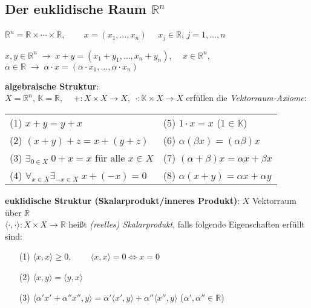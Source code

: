 \subsection{%
    \texorpdfstring{Der euklidische Raum $\mathbb{R}^n$}%
    {Der euklidische Raum ℝⁿ}%
}

$\mathbb{R}^n = \mathbb{R} \times \cdots \times \mathbb{R}$,
$\qquad x = (x_1, \ldots, x_n) \quad$ $x_j \in \mathbb{R}$,
$j = 1, \ldots, n$

$x, y \in \mathbb{R}^n \;\rightarrow\; x + y = (x_1 + y_1, \ldots, x_n + y_n)$,
$\quad x \in \mathbb{R}^n$, $\alpha \in \mathbb{R} \;\rightarrow\;
\alpha \cdot x = (\alpha \cdot x_1, \ldots, \alpha \cdot x_n)$

\textbf{algebraische Struktur}: \\
$X = \mathbb{R}^n$, $\mathbb{K} = \mathbb{R}$,
$\quad \boldsymbol{+}: X \times X \rightarrow X$, $\;\boldsymbol{\cdot}:
\mathbb{K} \times X \rightarrow X$
erfüllen die \emph{Vektorraum-Axiome}:

\begin{tabular}{p{8cm}p{8cm}}
    (1) $x + y = y + x$ &
    (5) $1 \cdot x = x$ ($1 \in \mathbb{K}$) \\
    (2) $(x + y) + z = x + (y + z)$ &
    (6) $\alpha (\beta x) = (\alpha \beta) x$ \\
    (3) $\exists_{0 \in X}\; 0 + x = x$ für alle $x \in X$ &
    (7) $(\alpha + \beta) x = \alpha x + \beta x$ \\
    (4) $\forall_{x \in X} \exists_{-x \in X}\; x + (-x) = 0$ &
    (8) $\alpha (x + y) = \alpha x + \alpha y$
\end{tabular}

\vspace{12pt}
\linie

\textbf{euklidische Struktur (Skalarprodukt/inneres Produkt)}:
$X$ Vektorraum über $\mathbb{R}$ \\
$\langle \cdot, \cdot \rangle:
X \times X \rightarrow \mathbb{R}$ heißt \emph{(reelles) Skalarprodukt}, falls
folgende Eigenschaften erfüllt sind:

\begin{itemize}
    \item[(1)] $\langle x, x \rangle \ge 0$,
    $\qquad \langle x, x \rangle = 0 \Leftrightarrow x = 0$
    
    \item[(2)] $\langle x, y \rangle = \langle y, x \rangle$
    
    \item[(3)] $\langle \alpha' x' + \alpha'' x'', y \rangle =
    \alpha' \langle x', y \rangle + \alpha'' \langle x'', y \rangle$
    \qquad ($\alpha', \alpha'' \in \mathbb{R}$)
\end{itemize}

